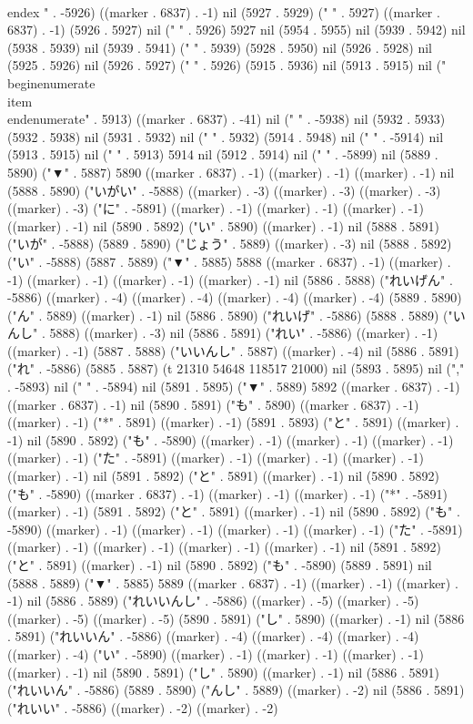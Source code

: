   \\end{ex}
" . -5926) ((marker . 6837) . -1) nil (5927 . 5929) (" " . 5927) ((marker . 6837) . -1) (5926 . 5927) nil (" " . 5926) 5927 nil (5954 . 5955) nil (5939 . 5942) nil (5938 . 5939) nil (5939 . 5941) ("   " . 5939) (5928 . 5950) nil (5926 . 5928) nil (5925 . 5926) nil (5926 . 5927) ("  " . 5926) (5915 . 5936) nil (5913 . 5915) nil ("
\\begin{enumerate}
 \\item
\\end{enumerate}" . 5913) ((marker . 6837) . -41) nil (" " . -5938) nil (5932 . 5933) (5932 . 5938) nil (5931 . 5932) nil (" " . 5932) (5914 . 5948) nil (" " . -5914) nil (5913 . 5915) nil (" " . 5913) 5914 nil (5912 . 5914) nil (" " . -5899) nil (5889 . 5890) ("▼" . 5887) 5890 ((marker . 6837) . -1) ((marker) . -1) ((marker) . -1) nil (5888 . 5890) ("いがい" . -5888) ((marker) . -3) ((marker) . -3) ((marker) . -3) ((marker) . -3) ("に" . -5891) ((marker) . -1) ((marker) . -1) ((marker) . -1) ((marker) . -1) nil (5890 . 5892) ("い" . 5890) ((marker) . -1) nil (5888 . 5891) ("いが" . -5888) (5889 . 5890) ("じょう" . 5889) ((marker) . -3) nil (5888 . 5892) ("い" . -5888) (5887 . 5889) ("▼" . 5885) 5888 ((marker . 6837) . -1) ((marker) . -1) ((marker) . -1) ((marker) . -1) ((marker) . -1) nil (5886 . 5888) ("れいげん" . -5886) ((marker) . -4) ((marker) . -4) ((marker) . -4) ((marker) . -4) (5889 . 5890) ("ん" . 5889) ((marker) . -1) nil (5886 . 5890) ("れいげ" . -5886) (5888 . 5889) ("いんし" . 5888) ((marker) . -3) nil (5886 . 5891) ("れい" . -5886) ((marker) . -1) ((marker) . -1) (5887 . 5888) ("いいんし" . 5887) ((marker) . -4) nil (5886 . 5891) ("れ" . -5886) (5885 . 5887) (t 21310 54648 118517 21000) nil (5893 . 5895) nil ("," . -5893) nil (" " . -5894) nil (5891 . 5895) ("▼" . 5889) 5892 ((marker . 6837) . -1) ((marker . 6837) . -1) nil (5890 . 5891) ("も" . 5890) ((marker . 6837) . -1) ((marker) . -1) ("*" . 5891) ((marker) . -1) (5891 . 5893) ("と" . 5891) ((marker) . -1) nil (5890 . 5892) ("も" . -5890) ((marker) . -1) ((marker) . -1) ((marker) . -1) ((marker) . -1) ("た" . -5891) ((marker) . -1) ((marker) . -1) ((marker) . -1) ((marker) . -1) nil (5891 . 5892) ("と" . 5891) ((marker) . -1) nil (5890 . 5892) ("も" . -5890) ((marker . 6837) . -1) ((marker) . -1) ((marker) . -1) ("*" . -5891) ((marker) . -1) (5891 . 5892) ("と" . 5891) ((marker) . -1) nil (5890 . 5892) ("も" . -5890) ((marker) . -1) ((marker) . -1) ((marker) . -1) ((marker) . -1) ("た" . -5891) ((marker) . -1) ((marker) . -1) ((marker) . -1) ((marker) . -1) nil (5891 . 5892) ("と" . 5891) ((marker) . -1) nil (5890 . 5892) ("も" . -5890) (5889 . 5891) nil (5888 . 5889) ("▼" . 5885) 5889 ((marker . 6837) . -1) ((marker) . -1) ((marker) . -1) nil (5886 . 5889) ("れいいんし" . -5886) ((marker) . -5) ((marker) . -5) ((marker) . -5) ((marker) . -5) (5890 . 5891) ("し" . 5890) ((marker) . -1) nil (5886 . 5891) ("れいいん" . -5886) ((marker) . -4) ((marker) . -4) ((marker) . -4) ((marker) . -4) ("い" . -5890) ((marker) . -1) ((marker) . -1) ((marker) . -1) ((marker) . -1) nil (5890 . 5891) ("し" . 5890) ((marker) . -1) nil (5886 . 5891) ("れいいん" . -5886) (5889 . 5890) ("んし" . 5889) ((marker) . -2) nil (5886 . 5891) ("れいい" . -5886) ((marker) . -2) ((marker) . -2) 